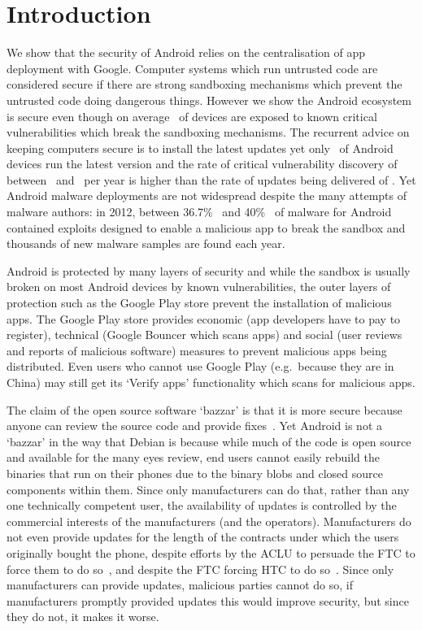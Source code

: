 \documentclass{llncs}
\begin{document}
\section{Introduction}
We show that the security of Android relies on the centralisation of app deployment with Google.
Computer systems which run untrusted code are considered secure if there are strong sandboxing mechanisms which prevent the untrusted code doing dangerous things.
However we show the Android ecosystem is secure even though on average \daMeanInsecurityPercTwosfNominal\ of devices are exposed to known critical vulnerabilities which break the sandboxing mechanisms.
The recurrent advice on keeping computers secure is to install the latest updates yet only \daUpdatednessPercTwosfNominal\ of Android devices run the latest version and the rate of critical vulnerability discovery of between \avoVulnsPerYearAllAndroidTwosfNominal\ and \avoVulnsPerYearTwosfNominal\ per year is higher than the rate of updates being delivered of \daUpdatesPerYearTwosfNominal.
Yet Android malware deployments are not widespread despite the many attempts of malware authors:
in 2012, between 36.7\%~\cite{Zhou2012b} and 40\%~\cite{Zhou2012a} of malware for Android contained exploits designed to enable a malicious app to break the sandbox and thousands of new malware samples are found each year.

Android is protected by many layers of security and while the sandbox is usually broken on most Android devices by known vulnerabilities, the outer layers of protection such as the Google Play store prevent the installation of malicious apps.
The Google Play store provides economic (app developers have to pay to register), technical (Google Bouncer which scans apps) and social (user reviews and reports of malicious software) measures to prevent malicious apps being distributed.
Even users who cannot use Google Play (e.g.\ because they are in China) may still get its `Verify apps' functionality which scans for malicious apps.

The claim of the open source software `bazzar' is that it is more secure because anyone can review the source code and provide fixes~\cite{Raymond1999}.
Yet Android is not a `bazzar' in the way that Debian is because while much of the code is open source and available for the many eyes review, end users cannot easily rebuild the binaries that run on their phones due to the binary blobs and closed source components within them.
Since only manufacturers can do that, rather than any one technically competent user, the availability of updates is controlled by the commercial interests of the manufacturers (and the operators).
Manufacturers do not even provide updates for the length of the contracts under which the users originally bought the phone, despite efforts by the ACLU to persuade the FTC to force them to do so~\cite{Soghoian2013}, and despite the FTC forcing HTC to do so~\cite{FTCHTC2013}.
Since only manufacturers can provide updates, malicious parties cannot do so, if manufacturers promptly provided updates this would improve security, but since they do not, it makes it worse.
\end{document}
